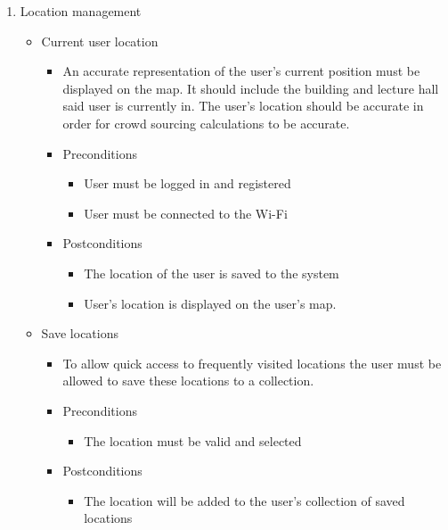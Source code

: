 \documentclass[12pt]{article}
\begin{document}
\begin{enumerate}
			\item Location management
			\begin{itemize}
				\item Current user location
				\begin{itemize}
					\item An accurate representation of the user’s current position must be displayed on the map. It should include the building and lecture hall said user is currently in. The user’s location should be accurate in order for crowd sourcing calculations to be accurate.
					\item Preconditions
					\begin{itemize}
						\item User must be logged in and registered
						\item User must be connected to the Wi-Fi
					\end{itemize}
					\item Postconditions
					\begin{itemize}
						\item The location of the user is saved to the system 
						\item User’s location is displayed on the user’s map.
					\end{itemize}
				\end{itemize}				
				
				\item Save locations
				\begin{itemize}
					\item To allow quick access to frequently visited locations the user must be allowed to save these locations to a collection.
					\item Preconditions
					\begin{itemize}
						\item The location must be valid and selected
					\end{itemize}
					\item Postconditions
					\begin{itemize}
						\item The location will be added to the user’s collection of saved locations
					\end{itemize}
				\end{itemize}
				

\end{itemize}
\end{enumerate}
\end{document}

